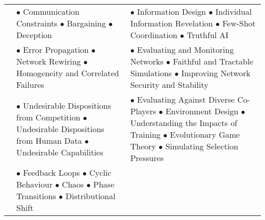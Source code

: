 \begin{table}[htp]
\begin{tabularx}{\linewidth}{>{\raggedright\arraybackslash}p{2.5cm} >{\raggedright\arraybackslash}p{4.5cm} >{\raggedright\arraybackslash}p{8cm}}
        \midrule
        {\nameref{sec:information_asymmetries} \newline \pa \newline \pa } &
        {$\bullet$ Communication Constraints \newline $\bullet$ Bargaining \newline $\bullet$ Deception } & 
        {$\bullet$ Information Design \newline $\bullet$ Individual Information Revelation \newline $\bullet$ Few-Shot Coordination \newline $\bullet$ Truthful AI} \\
        {\nameref{sec:network_effects} \newline \pa \newline \pa} &
        {$\bullet$ Error Propagation \newline $\bullet$ Network Rewiring \newline $\bullet$ Homogeneity and Correlated Failures} & 
        {$\bullet$ Evaluating and Monitoring Networks \newline $\bullet$ Faithful and Tractable Simulations \newline $\bullet$ Improving Network Security and Stability} \\
        {\nameref{sec:selection_pressures} \newline \pa \newline \pa \newline \pa} &
        {$\bullet$ Undesirable Dispositions from Competition \newline $\bullet$ Undesirable Dispositions from Human Data \newline $\bullet$ Undesirable Capabilities} & 
        {$\bullet$ Evaluating Against Diverse Co-Players \newline $\bullet$ Environment Design \newline $\bullet$ Understanding the Impacts of Training \newline $\bullet$ Evolutionary Game Theory \newline $\bullet$ Simulating Selection Pressures} \\
        {\nameref{sec:destabilising_dynamics} \newline \pa \newline \pa \newline \pa} &
        {$\bullet$ Feedback Loops \newline $\bullet$ Cyclic Behaviour \newline $\bullet$ Chaos \newline $\bullet$ Phase Transitions \newline $\bullet$ Distributional Shift} & 

\end{tabularx}
\end{table}
